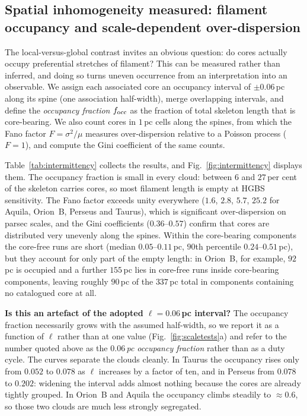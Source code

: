 \documentclass[usenatbib,twoside,twocolumn]{mnras}
\begin{document}
\subsection{Spatial inhomogeneity measured: filament occupancy and scale-dependent over-dispersion}
\label{sec:intermittency}

The local-versus-global contrast invites an obvious question: do cores actually occupy preferential stretches of filament? This can be measured rather than inferred, and doing so turns uneven occurrence from an interpretation into an observable. We assign each associated core an occupancy interval of $\pm0.06$\,pc along its spine (one association half-width), merge overlapping intervals, and define the \emph{occupancy fraction} $f_{\rm occ}$ as the fraction of total skeleton length that is core-bearing. We also count cores in $1$\,pc cells along the spines, from which the Fano factor $F=\sigma^2/\mu$ measures over-dispersion relative to a Poisson process ($F=1$), and compute the Gini coefficient of the same counts.

Table~\ref{tab:intermittency} collects the results, and Fig.~\ref{fig:intermittency} displays them. The occupancy fraction is small in every cloud: between $6$ and $27$\,per cent of the skeleton carries cores, so most filament length is empty at HGBS sensitivity. The Fano factor exceeds unity everywhere ($1.6$, $2.8$, $5.7$, $25.2$ for Aquila, Orion~B, Perseus and Taurus), which is significant over-dispersion on parsec scales, and the Gini coefficients ($0.36$--$0.57$) confirm that cores are distributed very unevenly along the spines. Within the core-bearing components the core-free runs are short (median $0.05$--$0.11$\,pc, $90$th percentile $0.24$--$0.51$\,pc), but they account for only part of the empty length: in Orion~B, for example, $92$\,pc is occupied and a further $155$\,pc lies in core-free runs inside core-bearing components, leaving roughly $90$\,pc of the $337$\,pc total in components containing no catalogued core at all.

\smallskip\noindent\textbf{Is this an artefact of the adopted $\ell=0.06$\,pc interval?} The occupancy fraction necessarily grows with the assumed half-width, so we report it as a function of $\ell$ rather than at one value (Fig.~\ref{fig:scaletests}a) and refer to the number quoted above as the \emph{$0.06$\,pc occupancy fraction} rather than as a duty cycle. The curves separate the clouds cleanly. In Taurus the occupancy rises only from $0.052$ to $0.078$ as $\ell$ increases by a factor of ten, and in Perseus from $0.078$ to $0.202$: widening the interval adds almost nothing because the cores are already tightly grouped. In Orion~B and Aquila the occupancy climbs steadily to $\approx0.6$, so those two clouds are much less strongly segregated. 
\end{document}
